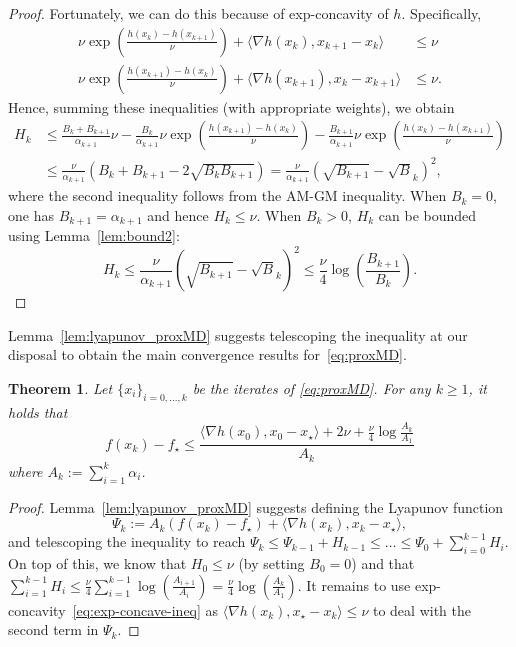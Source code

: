 \documentclass[a4paper]{article}
\renewcommand{\leq}{\leqslant}
\renewcommand{\geq}{\geqslant}
\newcommand{\coloneqq}{:=}
\newcommand{\ip}[2]{\langle #1, #2\rangle}
\newtheorem{theorem}{Theorem}
\begin{document}
\begin{proof}
        Fortunately, we can do this because of exp-concavity of $h$. Specifically,
        \begin{align*}
                \nu \exp\left(\tfrac{h(x_k)-h(x_{k+1})}{\nu}\right)+\ip{\nabla h(x_k)}{ x_{k+1}-x_k} &\leq \nu\\
                \nu \exp\left(\tfrac{h(x_{k+1})-h(x_{k})}{\nu}\right)+\ip{ \nabla h(x_{k+1})}{ x_{k}-x_{k+1}} &\leq \nu.
        \end{align*}
        Hence, summing these inequalities (with appropriate weights), we obtain
        \begin{align*}
                H_k &\leq \frac{B_k+B_{k+1}}{\alpha_{k+1}}\nu - \frac{B_k}{\alpha_{k+1}}\nu \exp\left(\tfrac{h(x_{k+1})-h(x_{k})}{\nu}\right) - \frac{B_{k+1}}{\alpha_{k+1}}\nu \exp\left(\tfrac{h(x_k)-h(x_{k+1})}{\nu}\right) \\
                &\leq \frac{\nu}{\alpha_{k+1}}\left( B_k + B_{k+1}-2\sqrt{B_{k}B_{k+1}}\right) = \frac{\nu}{\alpha_{k+1}} \left(\sqrt{B_{k+1}}-\sqrt B_k\right)^2,
        \end{align*}
        where the second inequality follows from the AM-GM inequality.
        When $B_k=0$, one has $B_{k+1}=\alpha_{k+1}$ and hence $H_k\leq \nu$.
        When $B_k>0$, $H_k$ can be bounded using Lemma~\ref{lem:bound2}:
        \begin{equation*}
                H_k\leq \frac{\nu}{\alpha_{k+1}} \left(\sqrt{B_{k+1}}-\sqrt B_k\right)^2 \leq  \frac{\nu}{4}\log\left(\frac{B_{k+1}}{B_k}\right).
        \end{equation*}
\end{proof}

Lemma~\ref{lem:lyapunov_proxMD} suggests telescoping the inequality at our disposal to obtain the main convergence results for~\eqref{eq:proxMD}.
\begin{theorem}\label{thm:proxMD}
        Let $\{x_i\}_{i=0,\ldots,k}$ be the iterates of \eqref{eq:proxMD}.
        For any $k\geq 1$, it holds that
        \begin{equation}\label{eq:proxMD_guarantee}
                f(x_k)-f_\star\leq \frac{ \ip{\nabla h(x_{0})}{ x_{0}-x_\star} + 2\nu + \frac \nu 4\log\frac{A_k}{A_1}}{A_k}
        \end{equation}
        where $A_k \coloneqq \sum_{i=1}^k\alpha_i$.
\end{theorem}
\begin{proof}
        Lemma~\ref{lem:lyapunov_proxMD} suggests defining the Lyapunov function
        \[
        \Psi_k\coloneqq A_k\left(f(x_{k})-f_\star\right) + \ip{\nabla h(x_{k})}{ x_{k}-x_\star},
        \]
        and telescoping the inequality to reach $\Psi_k\leq \Psi_{k-1}+H_{k-1}\leq \ldots \leq \Psi_{0}+\sum_{i=0}^{k-1} H_{i}$. 
        On top of this, we know that $H_0\leq \nu$ (by setting $B_0=0$) and that $\sum_{i=1}^{k-1}H_i\leq \frac\nu 4\sum_{i=1}^{k-1} \log\left(\frac{A_{i+1}}{A_i}\right)= \frac\nu 4 \log\left(\frac{A_{k}}{A_1}\right)$. It remains to use exp-concavity~\eqref{eq:exp-concave-ineq} as $\ip{\nabla h(x_{k})}{x_\star- x_{k}}\leq \nu$ to deal with the second term in $\Psi_k$.
\end{proof}
\end{document}
